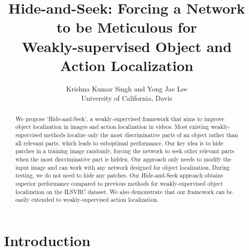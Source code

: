 \documentclass[10pt,twocolumn,letterpaper]{article}
\begin{document}
\title{Hide-and-Seek: Forcing a Network to be Meticulous for\\Weakly-supervised Object and Action Localization}


\author{Krishna Kumar Singh and Yong Jae Lee\\
	University of California, Davis}

\maketitle


\begin{abstract}
\vspace*{-0.1in}
We propose `Hide-and-Seek', a weakly-supervised framework that aims to improve object localization in images and action localization in videos.  Most existing weakly-supervised methods localize only the most discriminative parts of an object rather than all relevant parts, which leads to suboptimal performance. Our key idea is to hide patches in a training image randomly, forcing the network to seek other relevant parts when the most discriminative part is hidden. Our approach only needs to modify the input image and can work with any network designed for object localization.  During testing, we do not need to hide any patches.  Our Hide-and-Seek approach obtains superior performance compared to previous methods for weakly-supervised object localization on the ILSVRC dataset.  We also demonstrate that our framework can be easily extended to weakly-supervised action localization.
\end{abstract}

\vspace*{-0.1in}\section{Introduction}\vspace*{-0.05in}
\end{document}
